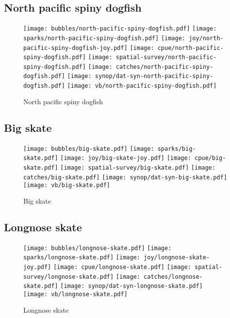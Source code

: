 \subsection*{North pacific spiny dogfish}

\begin{figure}[htbp]
\centering
\texttt{[image: bubbles/north-pacific-spiny-dogfish.pdf]}
\texttt{[image: sparks/north-pacific-spiny-dogfish.pdf]}
\texttt{[image: joy/north-pacific-spiny-dogfish-joy.pdf]}
\texttt{[image: cpue/north-pacific-spiny-dogfish.pdf]}
\texttt{[image: spatial-survey/north-pacific-spiny-dogfish.pdf]}
\texttt{[image: catches/north-pacific-spiny-dogfish.pdf]}
\texttt{[image: synop/dat-syn-north-pacific-spiny-dogfish.pdf]}
\texttt{[image: vb/north-pacific-spiny-dogfish.pdf]}
\caption{North pacific spiny dogfish}
\end{figure}
\clearpage
\subsection*{Big skate}

\begin{figure}[htbp]
\centering
\texttt{[image: bubbles/big-skate.pdf]}
\texttt{[image: sparks/big-skate.pdf]}
\texttt{[image: joy/big-skate-joy.pdf]}
\texttt{[image: cpue/big-skate.pdf]}
\texttt{[image: spatial-survey/big-skate.pdf]}
\texttt{[image: catches/big-skate.pdf]}
\texttt{[image: synop/dat-syn-big-skate.pdf]}
\texttt{[image: vb/big-skate.pdf]}
\caption{Big skate}
\end{figure}
\clearpage
\subsection*{Longnose skate}

\begin{figure}[htbp]
\centering
\texttt{[image: bubbles/longnose-skate.pdf]}
\texttt{[image: sparks/longnose-skate.pdf]}
\texttt{[image: joy/longnose-skate-joy.pdf]}
\texttt{[image: cpue/longnose-skate.pdf]}
\texttt{[image: spatial-survey/longnose-skate.pdf]}
\texttt{[image: catches/longnose-skate.pdf]}
\texttt{[image: synop/dat-syn-longnose-skate.pdf]}
\texttt{[image: vb/longnose-skate.pdf]}
\caption{Longnose skate}
\end{figure}
\clearpage
